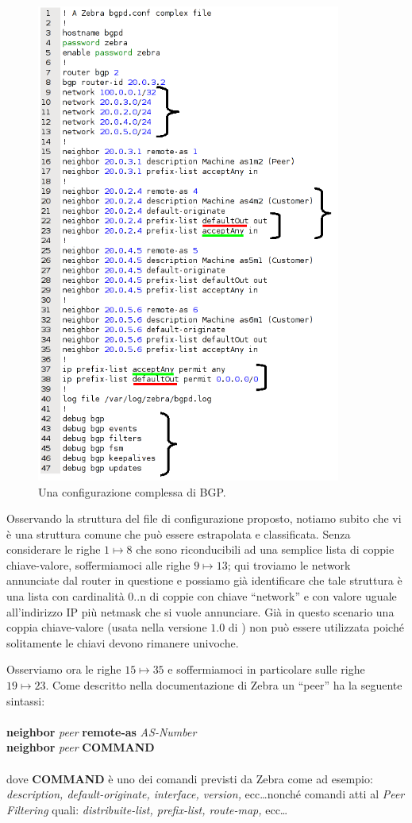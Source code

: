 \begin{figure}[!htb]
	\centering
	\includegraphics[width=10cm]{images/bgp_conf_schema.png}
	\caption{Una configurazione complessa di BGP.}
	\label{figura:bgp_conf_schema}
\end{figure}

Osservando la struttura del file di configurazione proposto, notiamo subito che vi è una struttura comune che può essere estrapolata e classificata. Senza considerare le righe $1\mapsto8$ che sono riconducibili ad una semplice lista di coppie chiave-valore, soffermiamoci alle righe $9\mapsto13$; qui troviamo le network annunciate dal router in questione e possiamo già identificare che tale struttura è una lista con cardinalità 0..n di coppie con chiave ``network'' e con valore uguale all'indirizzo IP più netmask che si vuole annunciare. Già in questo scenario una coppia chiave-valore (usata nella versione $1.0$ di \visualnetkit{}) non può essere utilizzata poiché solitamente le chiavi devono rimanere univoche.

Osserviamo ora le righe $15\mapsto35$ e soffermiamoci in particolare sulle righe $19\mapsto23$. Come descritto nella documentazione di Zebra\cite{ZEBRADOC} un ``peer'' ha la seguente sintassi:
\\
\\
\textbf{neighbor} \textit{peer} \textbf{remote-as} \textit{AS-Number}
\\
\textbf{neighbor} \textit{peer} \textbf{COMMAND}
\\
\\
dove \textbf{COMMAND} è uno dei comandi previsti da Zebra come ad esempio: \emph{description, default-originate, interface, version,} ecc\ldots nonché comandi atti al \emph{Peer Filtering} quali: \emph{distribuite-list, prefix-list, route-map,} ecc\ldots

